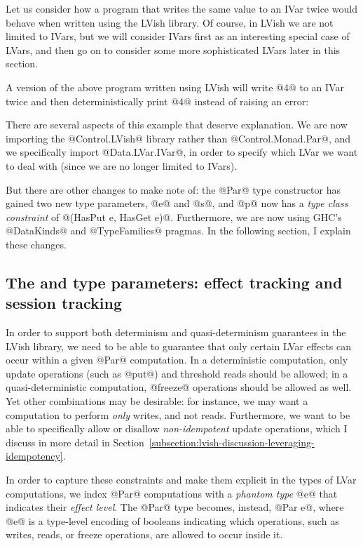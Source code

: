 Let us consider how a program that writes the same value to an IVar
twice would behave when written using the LVish library.  Of course,
in LVish we are not limited to IVars, but we will consider IVars first
as an interesting special case of LVars, and then go on to consider
some more sophisticated LVars later in this section.

A version of the above program written using LVish will write @4@ to
an IVar twice and then deterministically print @4@ instead of raising
an error:

\singlespacing

\doublespacing

There are several aspects of this example that deserve explanation.
We are now importing the @Control.LVish@ library rather than
@Control.Monad.Par@, and we specifically import @Data.LVar.IVar@, in
order to specify which LVar we want to deal with (since we are no
longer limited to IVars).

But there are other changes to make note of: the @Par@ type
constructor has gained two new type parameters, @e@ and @s@, and @p@
now has a \emph{type class constraint} of @(HasPut e, HasGet e)@.
Furthermore, we are now using GHC's @DataKinds@ and @TypeFamilies@
pragmas.  In the following section, I explain these changes.

\subsection{The  and  type parameters: effect tracking and session tracking}

In order to support both determinism and quasi-determinism guarantees
in the LVish library, we need to be able to guarantee that only
certain LVar effects can occur within a given @Par@ computation.  In a
deterministic computation, only update operations (such as @put@) and
threshold reads should be allowed; in a quasi-deterministic
computation, @freeze@ operations should be allowed as well.  Yet other
combinations may be desirable: for instance, we may want a computation
to perform \emph{only} writes, and not reads.  Furthermore, we want to
be able to specifically allow or disallow \emph{non-idempotent} update
operations, which I discuss in more detail in
Section~\ref{subsection:lvish-discussion-leveraging-idempotency}.

In order to capture these constraints and make them explicit in the
types of LVar computations, we index @Par@ computations with a
\emph{phantom type} @e@ that indicates their \emph{effect level}.  The
@Par@ type becomes, instead, @Par e@, where @e@ is a type-level
encoding of booleans indicating which operations, such as writes,
reads, or freeze operations, are allowed to occur inside it.

